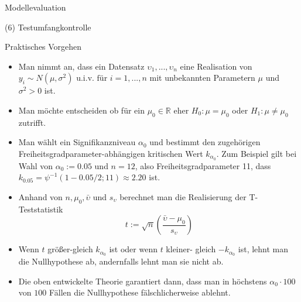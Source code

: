 \documentclass[
  8pt,
  ignorenonframetext,
]{beamer}
\begin{document}
\begin{frame}{Modellevaluation}
\protect\hypertarget{modellevaluation-14}{}
\justifying
{}

\noindent (6) Testumfangkontrolle \vspace{1mm}

Praktisches Vorgehen \small

\begin{itemize}
\item
  \justifying Man nimmt an, dass ein Datensatz
  \(\upsilon_1,...,\upsilon_n\) eine Realisation von
  \(y_i \sim N(\mu,\sigma^2) \mbox{ u.i.v. für } i = 1,...,n\) mit
  unbekannten Parametern \(\mu\) und \(\sigma^2 > 0\) ist.
\item
  Man möchte entscheiden ob für ein \(\mu_0 \in \mathbb{R}\) eher
  \(H_0 : \mu = \mu_0\) oder \(H_1: \mu \neq \mu_0\) zutrifft.

  \item

  Man wählt ein Signifikanzniveau \(\alpha_0\) und bestimmt den
  zugehörigen Freiheitsgradparameter-abhängigen kritischen Wert
  \(k_{\alpha_0}\). Zum Beispiel gilt bei Wahl von \(\alpha_0 := 0.05\)
  und \(n=12\), also Freiheitsgradparameter 11, dass
  \(k_{0.05}=\psi^{-1}(1 - 0.05/2; 11) \approx 2.20\) ist.
\item
  Anhand von \(n, \mu_0, \bar{\upsilon}\) und \(s_\upsilon\) berechnet
  man die Realisierung der T-Teststatistik \begin{equation}
  t := \sqrt{n}\left(\frac{\bar{\upsilon} - \mu_0}{s_\upsilon}\right)
  \end{equation}
\item
  Wenn \(t\) größer-gleich \(k_{\alpha_0}\) ist oder wenn \(t\) kleiner-
  gleich \(-k_{\alpha_0}\) ist, lehnt man die Nullhypothese ab,
  andernfalls lehnt man sie nicht ab.
\item
  Die oben entwickelte Theorie garantiert dann, dass man in höchstens
  \(\alpha_0 \cdot 100\) von \(100\) Fällen die Nullhypothese
  fälschlicherweise ablehnt.
\end{itemize}
\end{frame}
\end{document}
